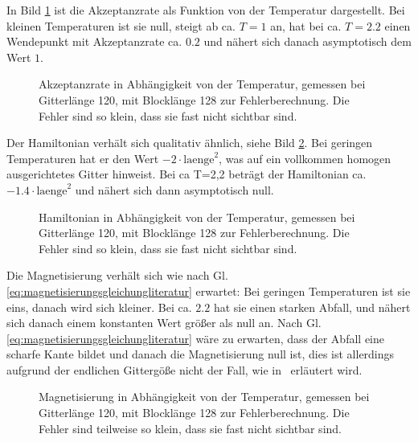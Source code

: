 	In Bild \ref{fig:ergebnisakzeptanzrate} ist die Akzeptanzrate als Funktion von der Temperatur dargestellt. Bei kleinen Temperaturen ist sie null, steigt ab ca. $T=1$ an, hat bei ca. $T=\num{2,2}$ einen Wendepunkt mit Akzeptanzrate ca. $\num{0,2}$ und nähert sich danach asymptotisch dem Wert $1$.
	
	\begin{figure}[htbp]
		
		\caption[Akzeptanzrate in Abhängigkeit von der Temperatur]{Akzeptanzrate in Abhängigkeit von der Temperatur, gemessen bei Gitterlänge 120, mit Blocklänge 128 zur Fehlerberechnung. Die Fehler sind so klein, dass sie fast nicht sichtbar sind.}
		\label{fig:ergebnisakzeptanzrate}
	\end{figure}
	
	Der Hamiltonian verhält sich qualitativ ähnlich, siehe Bild \ref{fig:ergebnishamiltonian}. Bei geringen Temperaturen hat er den Wert $-2\cdot\text{laenge}^2$, was auf ein vollkommen homogen ausgerichtetes Gitter hinweist. Bei ca T=2,2 beträgt der Hamiltonian ca. $-\num{1,4}\cdot\text{laenge}^2$ und nähert sich dann asymptotisch null.
	
	\begin{figure}[htbp]
		
		\caption[Hamiltonian in Abhängigkeit von der Temperatur]{Hamiltonian in Abhängigkeit von der Temperatur, gemessen bei Gitterlänge 120, mit Blocklänge 128 zur Fehlerberechnung. Die Fehler sind so klein, dass sie fast nicht sichtbar sind.}
		\label{fig:ergebnishamiltonian}
	\end{figure}
	

	Die Magnetisierung verhält sich wie nach Gl. \ref{eq:magnetisierungsgleichungliteratur} erwartet: Bei geringen Temperaturen ist sie eins, danach wird sich kleiner. Bei ca. $\num{2,2}$ hat sie einen starken Abfall, und nähert sich danach einem konstanten Wert größer als null an. Nach Gl. \ref{eq:magnetisierungsgleichungliteratur} wäre zu erwarten, dass der Abfall eine scharfe Kante bildet und danach die Magnetisierung null ist, dies ist allerdings aufgrund der endlichen Gittergöße nicht der Fall, wie in~\cite[Abschnitt 2.3.3]{binderheermann} erläutert wird.


	
	\begin{figure}[htbp]
		
		\caption[Magnetisierung in Abhängigkeit von der Temperatur]{Magnetisierung in Abhängigkeit von der Temperatur, gemessen bei Gitterlänge 120, mit Blocklänge 128 zur Fehlerberechnung. Die Fehler sind teilweise so klein, dass sie fast nicht sichtbar sind.}
		\label{fig:ergebnismagnetisierung}
	\end{figure}	
	
